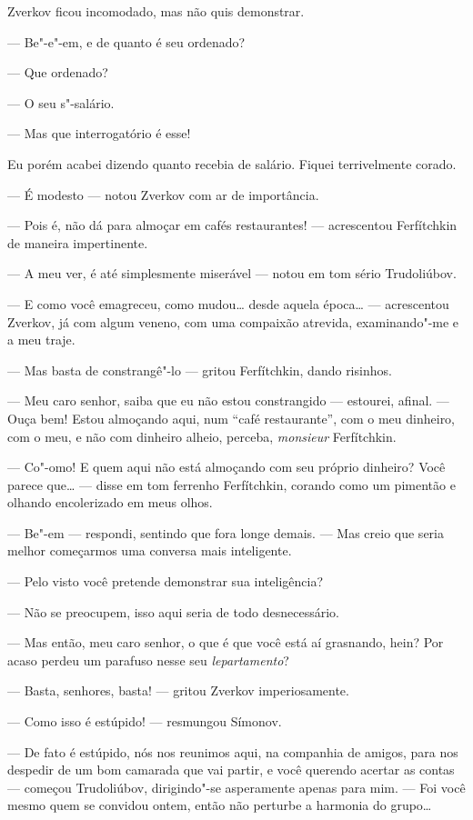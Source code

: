 Zverkov ficou incomodado, mas não quis demonstrar.

--- Be"-e"-em, e de quanto é seu ordenado?

--- Que ordenado?

--- O seu s"-salário.

--- Mas que interrogatório é esse!

Eu porém acabei dizendo quanto recebia de salário. Fiquei terrivelmente
corado.

--- É modesto --- notou Zverkov com ar de importância.

--- Pois é, não dá para almoçar em cafés restaurantes! --- acrescentou
Ferfítchkin de maneira impertinente.

--- A meu ver, é até simplesmente miserável --- notou em tom sério
Trudoliúbov.

--- E como você emagreceu, como mudou\ldots{} desde aquela época\ldots{} ---
acrescentou Zverkov, já com algum veneno, com uma compaixão atrevida,
examinando"-me e a meu traje.

--- Mas basta de constrangê"-lo --- gritou Ferfítchkin, dando risinhos.

--- Meu caro senhor, saiba que eu não estou constrangido --- estourei,
afinal. --- Ouça bem! Estou almoçando aqui, num “café restaurante”, com o
meu dinheiro, com o meu, e não com dinheiro alheio, perceba,
\textit{monsieur} Ferfítchkin.

--- Co"-omo! E quem aqui não está almoçando com seu próprio dinheiro? Você
parece que\ldots{} --- disse em tom ferrenho Ferfítchkin, corando como um
pimentão e olhando encolerizado em meus olhos.

--- Be"-em --- respondi, sentindo que fora longe demais. --- Mas creio que
seria melhor começarmos uma conversa mais inteligente.

--- Pelo visto você pretende demonstrar sua inteligência?

--- Não se preocupem, isso aqui seria de todo desnecessário.

--- Mas então, meu caro senhor, o que é que você está aí grasnando, hein?
Por acaso perdeu um parafuso nesse seu \textit{lepartamento}?

--- Basta, senhores, basta! --- gritou Zverkov imperiosamente.

--- Como isso é estúpido! --- resmungou Símonov.

--- De fato é estúpido, nós nos reunimos aqui, na companhia de amigos,
para nos despedir de um bom camarada que vai partir, e você querendo
acertar as contas --- começou Trudoliúbov, dirigindo"-se asperamente
apenas para mim. --- Foi você mesmo quem se convidou ontem, então não
perturbe a harmonia do grupo\ldots{}

